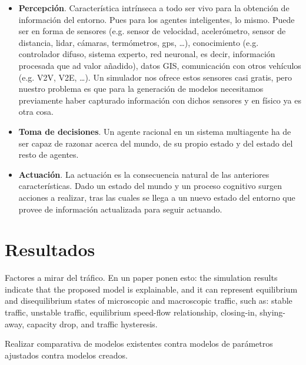 \begin{itemize}
	\item \textbf{Percepción}. Característica intrínseca a todo ser vivo para la obtención de información del entorno. Pues para los agentes inteligentes, lo mismo. Puede ser en forma de sensores (e.g. sensor de velocidad, acelerómetro, sensor de distancia, lidar, cámaras, termómetros, gps, \ldots), conocimiento (e.g. controlador difuso, sistema experto, red neuronal, es decir, información procesada que ad valor añadido), datos GIS, comunicación con otros vehículos (e.g. V2V, V2E, \ldots). Un simulador nos ofrece estos sensores casi gratis, pero nuestro problema es que para la generación de modelos necesitamos previamente haber capturado información con dichos sensores y en físico ya es otra cosa.
	\item \textbf{Toma de decisiones}. Un agente racional en un sistema multiagente ha de ser capaz de razonar acerca del mundo, de su propio estado y del estado del resto de agentes.
	\item \textbf{Actuación}. La actuación es la consecuencia natural de las anteriores características. Dado un estado del mundo y un proceso cognitivo surgen acciones a realizar, tras las cuales se llega a un nuevo estado del entorno que provee de información actualizada para seguir actuando.
\end{itemize}


\section{Resultados}
\label{ch:behavior-models-study:results}

Factores a mirar del tráfico. En un paper ponen esto: the simulation  results indicate that the proposed model is explainable, and it can represent equilibrium and disequilibrium states of microscopic and macroscopic traffic, such as: stable traffic, unstable traffic, equilibrium speed-flow relationship, closing-in, shying-away, capacity drop, and traffic hysteresis.

Realizar comparativa de modelos existentes contra modelos de parámetros ajustados contra modelos creados.